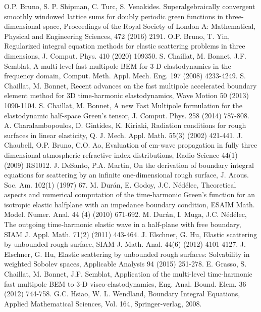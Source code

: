 \documentclass[10pt]{article}
\numberwithin{equation}{section}
\begin{document}
\begin{thebibliography}{00}
 O.P. Bruno, S. P. Shipman, C. Turc, S. Venakides. Superalgebraically convergent smoothly windowed lattice sums for doubly periodic green functions in three-dimensional space, Proceedings of the Royal Society of London A: Mathematical, Physical and Engineering Sciences, 472 (2016) 2191.
 O.P. Bruno, T. Yin, Regularized integral equation methods for elastic scattering problems in three dimensions, J. Comput. Phys. 410 (2020) 109350.
 S. Chaillat, M. Bonnet, J.F. Semblat, A multi-level fast multipole BEM for 3-D elastodynamics in the frequency domain, Comput. Meth. Appl. Mech. Eng. 197 (2008) 4233-4249.
 S. Chaillat, M. Bonnet, Recent advances on the fast multipole accelerated boundary element method for 3D time-harmonic elastodynamics, Wave Motion 50 (2013) 1090-1104.
 S. Chaillat, M. Bonnet, A new Fast Multipole formulation for the elastodynamic half-space Green's tensor, J. Comput. Phys. 258 (2014) 787-808.
 A. Charalambopoulos, D. Gintides, K. Kiriaki, Radiation conditions for rough surfaces in linear elasticity, Q. J. Mech. Appl. Math. 55(3) (2002) 421-441.
 J. Chaubell, O.P. Bruno, C.O. Ao, Evaluation of em-wave propagation in fully three dimensional atmospheric refractive index distributions, Radio Science 44(1) (2009) RS1012.
 J. DeSanto, P.A. Martin, On the derivation of boundary integral equations for scattering by an infinite one-dimensional rough surface, J. Acous. Soc. Am. 102(1) (1997) 67.
 M. Dur\'an, E. Godoy, J.C. N\'ed\'elec, Theoretical aspects and numerical computation of the time-harmonic Green's function for an isotropic elastic halfplane with an impedance boundary condition, ESAIM Math. Model. Numer. Anal. 44 (4) (2010) 671-692.
 M. Dur\'an, I. Muga, J.C. N\'ed\'elec, The outgoing time-harmonic elastic wave in a half-plane with free boundary, SIAM J. Appl. Math. 71(2) (2011) 443-464.
 J. Elschner, G. Hu, Elastic scattering by unbounded rough surface, SIAM J. Math. Anal. 44(6) (2012) 4101-4127.
 J. Elschner, G. Hu, Elastic scattering by unbounded rough surfaces: Solvability in weighted Sobolev spaces, Applicable Analysis 94 (2015) 251-278.
 E. Grasso, S. Chaillat, M. Bonnet, J.F. Semblat, Application of the multi-level time-harmonic fast multipole BEM to 3-D visco-elastodynamics, Eng. Anal. Bound. Elem. 36 (2012) 744-758.
 G.C. Hsiao, W. L. Wendland, Boundary Integral Equations, Applied Mathematical Sciences, Vol. 164, Springer-verlag, 2008.

\end{thebibliography}
\end{document}
